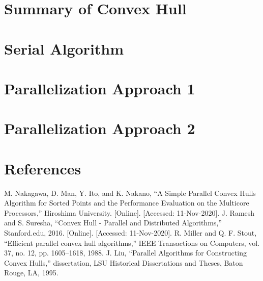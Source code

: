 \documentclass[conference]{IEEEtran}
\begin{document}
\section{Summary of Convex Hull}

\section{Serial Algorithm}

\section{Parallelization Approach 1}

\section{Parallelization Approach 2}

\section{References}
\begin{thebibliography}{00}
 M. Nakagawa, D. Man, Y. Ito, and K. Nakano, “A Simple Parallel Convex Hulls Algorithm for Sorted Points and the Performance Evaluation on the Multicore Processors,” Hiroshima University. [Online]. [Accessed: 11-Nov-2020].
 J. Ramesh and S. Suresha, “Convex Hull - Parallel and Distributed Algorithms,” Stanford.edu,
2016. [Online]. [Accessed: 11-Nov-2020].
 R. Miller and Q. F. Stout, “Efficient parallel convex hull algorithms,” IEEE Transactions on Computers, vol. 37, no. 12, pp. 1605–1618, 1988.
 J. Liu, “Parallel Algorithms for Constructing Convex Hulls,” dissertation, LSU Historical Dissertations and Theses, Baton Rouge, LA, 1995.
\end{thebibliography}
\end{document}

